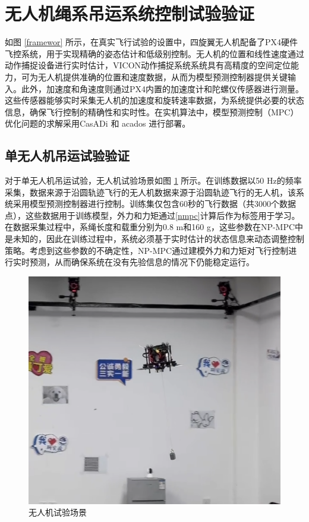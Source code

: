\documentclass[lang=chs, degree=master, blindreview=true, winfonts=true]{yanputhesis}
\begin{document}
\section{无人机绳系吊运系统控制试验验证}
如图 \ref{framewor} 所示，在真实飞行试验的设置中，四旋翼无人机配备了PX4硬件飞控系统，用于实现精确的姿态估计和低级别控制。无人机的位置和线性速度通过动作捕捉设备进行实时估计，VICON动作捕捉系统系统具有高精度的空间定位能力，可为无人机提供准确的位置和速度数据，从而为模型预测控制器提供关键输入。此外，加速度和角速度则通过PX4内置的加速度计和陀螺仪传感器进行测量。这些传感器能够实时采集无人机的加速度和旋转速率数据，为系统提供必要的状态信息，确保飞行控制的精确性和实时性。在实机算法中，模型预测控制（MPC）优化问题的求解采用CasADi \cite{Andersson2019} 和 acados \cite{Verschueren2022} 进行部署。
\subsection{单无人机吊运试验验证}
对于单无人机吊运试验，无人机试验场景如图 \ref{dan} 所示。在训练数据以50 Hz的频率采集，数据来源于沿圆轨迹飞行的无人机数据来源于沿圆轨迹飞行的无人机，该系统采用模型预测控制器进行控制。训练集仅包含60秒的飞行数据（共3000个数据点），这些数据用于训练模型，外力和力矩通过\autoref{nmpc}计算后作为标签用于学习。在数据采集过程中，系绳长度和载重分别为0.8 m和160 g，这些参数在NP-MPC中是未知的，因此在训练过程中，系统必须基于实时估计的状态信息来动态调整控制策略。考虑到这些参数的不确定性，NP-MPC通过建模外力和力矩对飞行控制进行实时预测，从而确保系统在没有先验信息的情况下仍能稳定运行。
\begin{figure}[hbt!]
	\centering
	\includegraphics[width=28pc]{picture/danjireal.png} 
	\caption{无人机试验场景} 
	\label{dan}
\end{figure}
\end{document}
